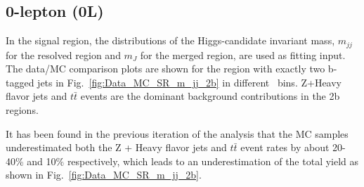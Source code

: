 \subsection{0-lepton (0L)}

\par In the signal region, the distributions of the Higgs-candidate invariant mass, $m_{jj}$ for the
 resolved region and $m_J$ for the merged region, are used as fitting input. The data/MC comparison plots are shown for the region
 with exactly two b-tagged jets in Fig.~\ref{fig:Data_MC_SR_m_jj_2b} in different \met~bins. Z+Heavy flavor jets and $t\bar{t}$ events are the dominant background contributions in the 2b regions.
\par It has been found in the previous iteration of the analysis that the MC samples underestimated both the Z + Heavy flavor jets and
$t\bar{t}$ event rates by about 20-40\% and 10\% respectively, which leads to an underestimation of the total yield as shown in Fig.~\ref{fig:Data_MC_SR_m_jj_2b}.



